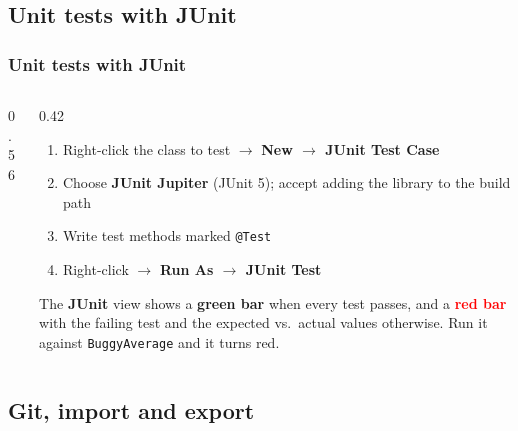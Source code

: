 \documentclass[aspectratio=169,10pt,compress]{beamer}
\newcommand{\menu}[1]{\textsf{\textbf{#1}}}                      %
\begin{document}
\subsection[JUnit]{Unit tests with JUnit}




\begin{frame}[t,fragile] \frametitle{Unit tests with JUnit}
  \begin{columns}[T]
    \begin{column}{0.56\textwidth}
    \end{column}
    \begin{column}{0.42\textwidth}
      \begin{enumerate}\small
        \item Right-click the class to test $\rightarrow$ \menu{New $\rightarrow$ JUnit Test Case}
        \item Choose \textbf{JUnit Jupiter} (JUnit 5); accept adding the library to the build path
        \item Write test methods marked \texttt{@Test}
        \item Right-click $\rightarrow$ \menu{Run As $\rightarrow$ JUnit Test}
      \end{enumerate}
      \small The \textbf{JUnit} view shows a \textcolor{green!50!black}{\textbf{green bar}} when every test passes,
      and a \textcolor{red}{\textbf{red bar}} with the failing test and the expected vs.\ actual values otherwise.
      Run it against \texttt{BuggyAverage} and it turns red.
    \end{column}
  \end{columns}
\end{frame}

\subsection[Git]{Git, import and export}
\end{document}
